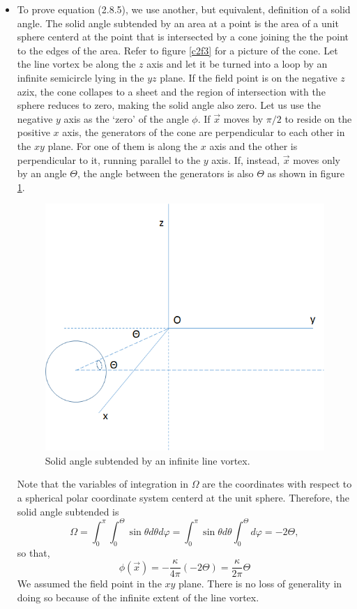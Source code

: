 \begin{itemize}
\item To prove equation (2.8.5), we use another, but equivalent, definition of a solid angle. The solid angle subtended by an area at a point is the area of a unit sphere centerd at the
point that is intersected by a cone joining the the point to the edges of the area. Refer to figure \ref{c2f3} for a picture of the cone. Let the line vortex be along the $z$ axis and let
it be turned into a loop by an infinite semicircle lying in the $yz$ plane. If the field point is on the negative $z$ azix, the cone collapes to a sheet and the region of intersection 
with the sphere reduces to zero, making the solid angle also zero. Let us use the negative $y$ axis as the \enquote*{zero} of the angle $\phi$. If $\vec{x}$ moves by $\pi/2$ to reside
on the positive $x$ axis, the generators of the cone are perpendicular to each other in the $xy$ plane. For one of them is along the $x$ axis and the other is perpendicular to it, running
parallel to the $y$ axis. If, instead, $\vec{x}$ moves only by an angle $\Theta$, the angle between the generators is also $\Theta$ as shown in figure \ref{c2f10}.
\begin{figure}[!ht]
\centering
\centerline{\includegraphics[scale=0.5]{c2f10}}
\caption{Solid angle subtended by an infinite line vortex.}
\label{c2f10}
\end{figure}
Note that the variables of integration in $\Omega$ are the coordinates with respect to a spherical polar coordinate system centerd at the unit sphere. Therefore, the solid angle 
subtended is
\[
\Omega = \int_0^{\pi}\int_{0}^{\Theta}\sin\theta d\theta d\varphi = \int_0^{\pi} \sin\theta d\theta \int_{0}^{\Theta} d\varphi = -2\Theta,
\]
so that,
\[
\phi(\vec{x}) = -\frac{\kappa}{4\pi}(-2\Theta) = \frac{\kappa}{2\pi}\Theta
\]
We assumed the field point in the $xy$ plane. There is no loss of generality in doing so because of the infinite extent of the line vortex.


\end{itemize}
